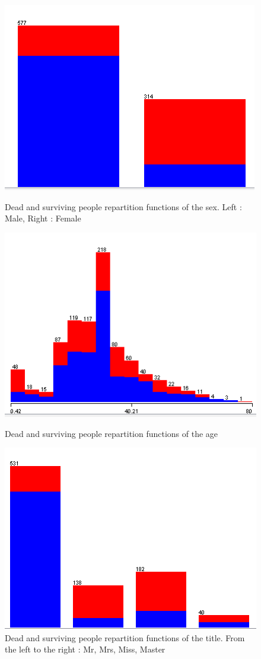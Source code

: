 \documentclass[11pt,a4paper,portrait]{article}
\begin{document}
\begin{figure}[!ht]
	\centering
	\begin{minipage}[t]{5.5cm}
		\includegraphics[scale=0.6]{sexsur.png}
		\caption{Dead and surviving people repartition functions of the sex. Left : Male, Right : Female}
		\label{sexsur}
	\end{minipage}
	\begin{minipage}[t]{5.5cm}
		\includegraphics[scale=0.6]{agesur.png}
		\caption{Dead and surviving people repartition functions of the age}
		\label{agesur}
	\end{minipage}
	\begin{minipage}[t]{5.5cm}
		\includegraphics[scale=0.6]{titlesur.png}
		\caption{Dead and surviving people repartition functions of the title.
	From the left to the right : Mr, Mrs, Miss, Master}
		\label{titlesur}
	\end{minipage}	
\end{figure}
\end{document}
